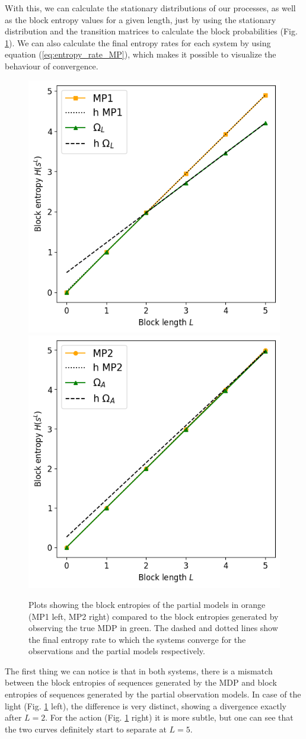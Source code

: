 \documentclass[12pt,a4paper]{article}
\begin{document}
With this, we can calculate the stationary distributions of our processes, as well as the block entropy values for a given length, just by using the stationary distribution and the transition matrices to calculate the block probabilities (Fig. \ref{fig:block_curves}).
We can also calculate the final entropy rates for each system by using equation (\ref{eq:entropy_rate_MP}), which makes it possible to visualize the behaviour of convergence.

\begin{figure}[H]
    \centering
    \includegraphics[width=0.49\linewidth]{../figures/mp1_obs_L_thesis.png}
    \includegraphics[width=0.49\linewidth]{../figures/mp2_obs_A_thesis.png}
    \caption{\label{fig:block_curves}Plots showing the block entropies of the partial models in orange (MP1 left, MP2 right) compared to the block entropies generated by observing the true MDP in green. The dashed and dotted lines show the final entropy rate to which the systems converge for the observations and the partial models respectively.}
\end{figure}

The first thing we can notice is that in both systems, there is a mismatch between the
block entropies of sequences generated by the MDP and block entropies of sequences generated by the partial observation models.
In case of the light (Fig. \ref{fig:block_curves} left), the difference is very distinct, showing a divergence exactly after $L=2$.
For the action (Fig. \ref{fig:block_curves} right) it is more subtle, but one can see that the two curves definitely start to separate at $L=5$.
\end{document}
